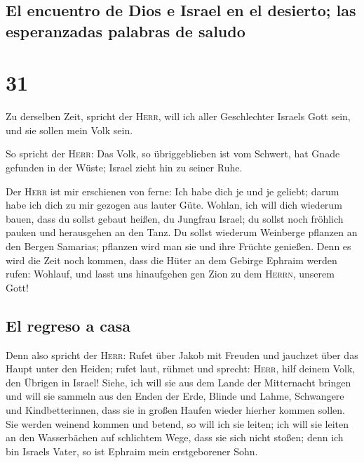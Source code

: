 \hypertarget{el-encuentro-de-dios-e-israel-en-el-desierto-las-esperanzadas-palabras-de-saludo}{%
\subsection{El encuentro de Dios e Israel en el desierto; las
esperanzadas palabras de
saludo}\label{el-encuentro-de-dios-e-israel-en-el-desierto-las-esperanzadas-palabras-de-saludo}}

\hypertarget{section-30}{%
\section{31}\label{section-30}}

 Zu derselben Zeit, spricht der \textsc{Herr}, will ich
aller Geschlechter Israels Gott sein, und sie sollen mein Volk sein.

 So spricht der \textsc{Herr}: Das Volk, so übriggeblieben
ist vom Schwert, hat Gnade gefunden in der Wüste; Israel zieht hin zu
seiner Ruhe.

 Der \textsc{Herr} ist mir erschienen von ferne: Ich habe
dich je und je geliebt; darum habe ich dich zu mir gezogen aus lauter
Güte.  Wohlan, ich will dich wiederum bauen, dass du
sollst gebaut heißen, du Jungfrau Israel; du sollst noch fröhlich pauken
und herausgehen an den Tanz.  Du sollst wiederum Weinberge
pflanzen an den Bergen Samarias; pflanzen wird man sie und ihre Früchte
genießen.  Denn es wird die Zeit noch kommen, dass die
Hüter an dem Gebirge Ephraim werden rufen: Wohlauf, und lasst uns
hinaufgehen gen Zion zu dem \textsc{Herrn}, unserem Gott!

\hypertarget{el-regreso-a-casa}{%
\subsection{El regreso a casa}\label{el-regreso-a-casa}}

 Denn also spricht der \textsc{Herr}: Rufet über Jakob mit
Freuden und jauchzet über das Haupt unter den Heiden; rufet laut, rühmet
und sprecht: \textsc{Herr}, hilf deinem Volk, den Übrigen in Israel!
 Siehe, ich will sie aus dem Lande der Mitternacht bringen
und will sie sammeln aus den Enden der Erde, Blinde und Lahme,
Schwangere und Kindbetterinnen, dass sie in großen Haufen wieder hierher
kommen sollen.  Sie werden weinend kommen und betend, so
will ich sie leiten; ich will sie leiten an den Wasserbächen auf
schlichtem Wege, dass sie sich nicht stoßen; denn ich bin Israels Vater,
so ist Ephraim mein erstgeborener Sohn.

